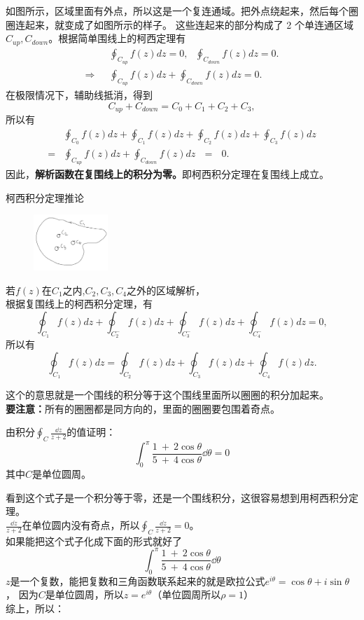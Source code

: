 \documentclass[cn,hazy,blue,14pt,normal]{elegantnote}
\numberwithin{equation}{section}
\begin{document}
如图所示，区域里面有外点，所以这是一个复连通域。把外点绕起来，然后每个圈圈连起来，就变成了如图所示的样子。
这些连起来的部分构成了 2 个单连通区域 $C_{up}, C_{down}$。根据简单围线上的柯西定理有
\begin{align*}
&\oint_{C_{up}} f(z) dz = 0, ~~~ \oint_{C_{down}} f(z) dz = 0. 
\\\Rightarrow ~~~ &\oint_{C_{up}} f(z) dz + \oint_{C_{down}} f(z) dz = 0.
\end{align*}
在极限情况下，辅助线抵消，得到
$$
C_{up} + C_{down} = C_0 + C_1 + C_2 + C_3,
$$
所以有
\begin{align*}
&\oint_{C_0} f(z) dz + \oint_{C_1} f(z) dz + \oint_{C_2} f(z)dz + \oint_{C_3} f(z) dz \\
=&\oint_{C_{up}} f(z) dz + \oint_{C_{down}} f(z) dz ~~~=~~~  0.
\end{align*}
因此，\textbf{解析函数在复围线上的积分为零。}即柯西积分定理在复围线上成立。

\begin{theorem}\label{柯西积分定理推论}
	柯西积分定理推论
\end{theorem}

\begin{figure}
	\begin{center}
		\includegraphics[width=0.25\textwidth]{./image/柯西积分定理推论.png}
	\end{center}
\end{figure}
若$f(z)$在$C_1$之内,$C_2,C_3,C_4$之外的区域解析，\\
根据复围线上的柯西积分定理，有
$$
\oint_{C_1} f(z) dz + \oint_{C^-_2} f(z) dz + \oint_{C^-_3} f(z) dz + \oint_{C^-_4} f(z) dz = 0,
$$
所以有
$$
\oint_{C_1}f(z) dz = \oint_{C_2}f(z)dz + \oint_{C_3}f(z) dz + \oint_{C_4} f(z) dz.
$$
\begin{note}
	这个的意思就是一个围线的积分等于这个围线里面所以圈圈的积分加起来。\\
	\textbf{要注意：}所有的圈圈都是同方向的，里面的圈圈要包围着奇点。
\end{note}

\begin{example}
	由积分$\oint_C \frac{\dd z}{z+2}$的值证明：
	$$ \int_{0}^{\pi}\frac{1~+~2\cos\theta}{5~+~4\cos\theta}\dd \theta = 0 $$
	其中$C$是单位圆周。
\end{example}
看到这个式子是一个积分等于零，还是一个围线积分，这很容易想到用柯西积分定理。\\
$\frac{\dd z}{z+2}$在单位圆内没有奇点，所以$\oint_C \frac{\dd z}{z+2} = 0$。\\
如果能把这个式子化成下面的形式就好了
$$\int_{0}^{\pi}\frac{1~+~2\cos\theta}{5~+~4\cos\theta}\dd \theta$$
$z$是一个复数，能把复数和三角函数联系起来的就是欧拉公式$e^{i\theta} = \cos\theta + i\sin\theta$，
因为$C$是单位圆周，所以$z = e^{i\theta}$（单位圆周所以$\rho = 1$）\\
综上，所以：
\end{document}
